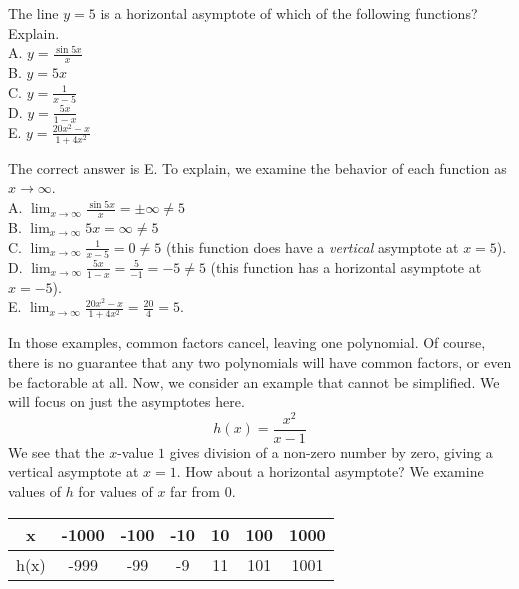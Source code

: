 \begin{Exercise} The line $y = 5$ is a horizontal 
	asymptote of which of the following functions? Explain. \\
	A. $y = \frac{\sin{5x}}{x}$\\
	B. $y = 5x$\\
	C. $y = \frac{1}{x-5}$\\
	D. $y = \frac{5x}{1-x}$\\
	E. $y = \frac{20x^2 - x}{1 + 4x^2}$
\end{Exercise}

\begin{Answer}[ref=ratfunc2]
	The correct answer is E. To explain, we examine the behavior of each 
	function as $x \to \infty$. \\
	A. $\lim_{x \to \infty} \frac{\sin{5x}}{x} = \pm \infty \neq 5$\\
	B. $\lim_{x \to \infty} 5x = \infty \neq 5$\\
	C. $\lim_{x \to \infty} \frac{1}{x-5} = 0 \neq 5$ (this function 
	does have a \textit{vertical} asymptote at $x = 5$). \\
	D. $\lim_{x \to \infty} \frac{5x}{1-x} = \frac{5}{-1} = -5 \neq 5$ 
	(this function has a horizontal asymptote at $x = -5$).\\
	E. $\lim_{x \to \infty} \frac{20x^2 - x}{1 + 4x^2} = \frac{20}{4} = 5$. 
\end{Answer}

In those examples, common factors cancel, leaving one polynomial. Of course, there is no guarantee that any two polynomials will have common factors, or even be factorable at all. Now, we consider an example that cannot be simplified. We will focus on just the asymptotes here.
\[ h(x) = \frac{x^2}{x - 1} \]
We see that the \( x \)-value \( 1 \) gives division of a non-zero number by zero, giving a vertical asymptote at \( x = 1 \). How about a horizontal asymptote? We examine values of \( h \) for values of \( x \) far from \( 0 \).

\begin{center}
\begin{tabular}{ |c|c|c|c|c|c|c| } 
 \hline
 x & -1000 & -100 & -10 & 10 & 100 & 1000 \\ 
 \hline
 h(x) & -999 & -99 & -9 & 11 & 101 & 1001 \\ 
 \hline
\end{tabular}
\end{center}

